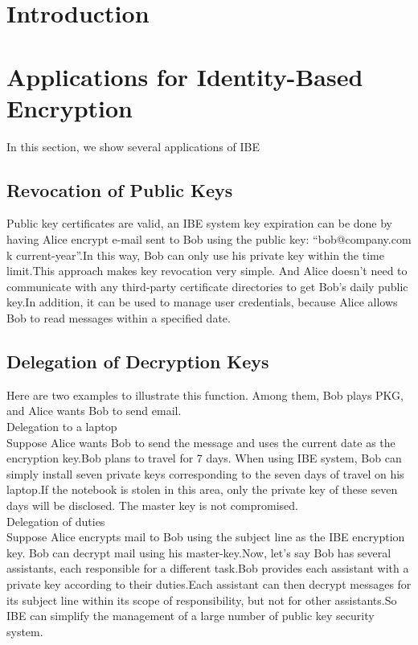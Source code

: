 \documentclass[runningheads,a4paper]{llncs}
\begin{document}
\author{}
\institute{}
\maketitle
\section{Introduction}


\section{Applications for Identity-Based Encryption}
In this section, we show several applications of IBE
\subsection{Revocation of Public Keys}
Public key certificates are valid, an IBE system key expiration can be done by having Alice encrypt e-mail sent to Bob using the public key: “bob@company.com k current-year”.In this way, Bob can only use his private key within the time limit.This approach makes key revocation very simple. And Alice doesn't need to communicate with any third-party certificate directories to get Bob's daily public key.In addition, it can be used to manage user credentials, because Alice allows Bob to read messages within a specified date.
\subsection{Delegation of Decryption Keys}
Here are two examples to illustrate this function. Among them, Bob plays PKG, and Alice wants Bob to send email.\\
Delegation to a laptop\\
Suppose Alice wants Bob to send the message and uses the current date as the encryption key.Bob plans to travel for 7 days. When using IBE system, Bob can simply install seven private keys corresponding to the seven days of travel on his laptop.If the notebook is stolen in this area, only the private key of these seven days will be disclosed. The master key is not compromised.\\
Delegation of duties\\
Suppose Alice encrypts mail to Bob using the subject line as the IBE encryption key. Bob can decrypt mail using his master-key.Now, let's say Bob has several assistants, each responsible for a different task.Bob provides each assistant with a private key according to their duties.Each assistant can then decrypt messages for its subject line within its scope of responsibility, but not for other assistants.So IBE can simplify the management of a large number of public key security system.
\end{document}

